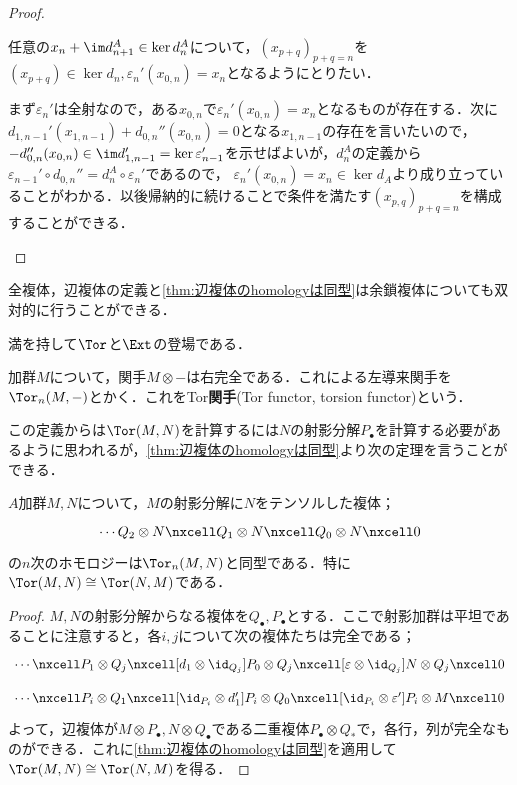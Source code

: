 \begin{proof}
\begin{step}
		任意の$x_n+\im d_{n+1}^A\in\ker d_n^A$について，$(x_{p+q})_{p+q=n}$を$(x_{p+q})\in\ker d_n,\varepsilon_n'(x_{0,n})=x_n$となるようにとりたい．
		
		まず$\varepsilon_n'$は全射なので，ある$x_{0,n}$で$\varepsilon_n'(x_{0,n})=x_n$となるものが存在する．次に$d_{1,n-1}'(x_{1,n-1})+d_{0,n}''(x_{0,n})=0$となる$x_{1,n-1}$の存在を言いたいので，$-d_{0,n}''(x_{0,n})\in\im d_{1,n-1}'=\ker\varepsilon_{n-1}'$を示せばよいが，$d_n^A$の定義から$\varepsilon_{n-1}'\circ d_{0,n}''=d_n^A\circ\varepsilon_n'$であるので， $\varepsilon_n'(x_{0,n})=x_n\in\ker d_A$より成り立っていることがわかる．以後帰納的に続けることで条件を満たす$(x_{p,q})_{p+q=n}$を構成することができる．
		
	\end{step}
\end{proof}

全複体，辺複体の定義と\ref{thm:辺複体のhomologyは同型}は余鎖複体についても双対的に行うことができる．

満を持して$\Tor$と$\Ext$の登場である．
\begin{defi}[$\Tor$関手]
	加群$M$について，関手$M\otimes -$は右完全である．これによる左導来関手を$\Tor_n(M,-)$とかく．これをTor\textbf{関手}(Tor functor, torsion functor)という．
\end{defi}

この定義からは$\Tor(M,N)$を計算するには$N$の射影分解$P_\bullet$を計算する必要があるように思われるが，\ref{thm:辺複体のhomologyは同型}より次の定理を言うことができる．

\begin{thm}
	$A$加群$M,N$について，$M$の射影分解に$N$をテンソルした複体；
	\[\begin{tikzcd}
		\cdots Q_2\otimes N\nxcell Q_1\otimes N\nxcell Q_0\otimes N\nxcell0
	\end{tikzcd}\]
	の$n$次のホモロジーは$\Tor_n(M,N)$と同型である．特に$\Tor(M,N)\cong\Tor(N,M)$である．
\end{thm}

\begin{proof}
	$M,N$の射影分解からなる複体を$Q_\bullet,P_\bullet$とする．ここで射影加群は平坦であることに注意すると，各$i,j$について次の複体たちは完全である；
	\[\begin{tikzcd}
		\cdots\nxcell P_1\otimes Q_j\nxcell[d_1\otimes\id_{Q_j}] P_0\otimes Q_j\nxcell[\varepsilon\otimes\id_{Q_j}]N\otimes Q_j\nxcell0
	\end{tikzcd}\]
	\[\begin{tikzcd}
		\cdots\nxcell P_i\otimes Q_1\nxcell[\id_{P_i}\otimes d_1'] P_i\otimes Q_0\nxcell[\id_{P_i}\otimes\varepsilon']P_i\otimes M\nxcell0
	\end{tikzcd}\]
	よって，辺複体が$M\otimes P_\bullet,N\otimes Q_\bullet$である二重複体$P_\bullet\otimes Q_\ast$で，各行，列が完全なものができる．これに\ref{thm:辺複体のhomologyは同型}を適用して$\Tor(M,N)\cong\Tor(N,M)$を得る．
\end{proof}

